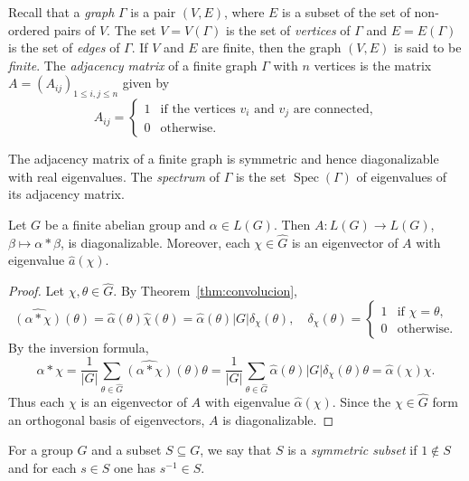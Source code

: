 Recall that a \emph{graph} $\Gamma$ is a pair $(V,E)$, where
$E$ is a subset of the set of non-ordered pairs of $V$. The set 
$V=V(\Gamma)$ is the set of \emph{vertices} of $\Gamma$ and $E=E(\Gamma)$
is the set of \emph{edges} of $\Gamma$. If $V$ and $E$ are finite, then the graph $(V,E)$ is said to be \emph{finite}. The 
\emph{adjacency matrix} of a finite graph $\Gamma$ with $n$ vertices is the matrix 
$A=(A_{ij})_{1\leq i,j\leq n}$ given by 
\[
  A_{ij}=\begin{cases}
    1 & \text{if the vertices $v_i$ and $v_j$ are connected,}\\
    0 & \text{otherwise.}
  \end{cases}
 \]

 The adjacency matrix of a finite graph is symmetric and hence
 diagonalizable with real eigenvalues. 
 The \emph{spectrum} of  $\Gamma$ is the set $\operatorname{Spec}(\Gamma)$ of eigenvalues
 of its adjacency matrix. 

\begin{lemma}
  \label{lem:eigenvalues}
  Let $G$ be a finite abelian group and $\alpha\in L(G)$. 
  Then $A\colon L(G)\to
  L(G)$, $\beta\mapsto \alpha*\beta$, is diagonalizable. Moreover, 
  each $\chi\in\widehat{G}$
  is an eigenvector of $A$ with eigenvalue $\widehat{a}(\chi)$. 
\end{lemma}

\begin{proof}
  Let $\chi,\theta\in\widehat{G}$. 
  By Theorem~\ref{thm:convolucion}, 
  \[
   \widehat{(\alpha*\chi)}(\theta)
    =\widehat{\alpha}(\theta)\widehat{\chi}(\theta)
    =\widehat{\alpha}({\theta})|G|\delta_{\chi}(\theta),
    \quad
    \delta_{\chi}(\theta)=\begin{cases} 
      1 & \text{if $\chi=\theta$},\\ 
      0 & \text{otherwise}.
    \end{cases}
  \]
  By the inversion formula, 
  \[
	\alpha*\chi=\frac{1}{|G|}\sum_{\theta\in\widehat{G}}\widehat{(\alpha*\chi)}(\theta)\theta
	=\frac{1}{|G|}\sum_{\theta\in\widehat{G}}\widehat{\alpha}(\theta)|G|\delta_{\chi}(\theta)\theta
	=\widehat{\alpha}(\chi)\chi. 
  \]
  Thus each $\chi$ is an eigenvector of $A$ with eigenvalue $\widehat{\alpha}(\chi)$. Since the 
  $\chi\in\widehat{G}$ form an orthogonal basis of eigenvectors, $A$ is diagonalizable. 
\end{proof}

For a group $G$ and a subset $S\subseteq G$, 
we say that $S$ is a \emph{symmetric subset} if
$1\not\in S$ and for each $s\in S$ one has $s^{-1}\in S$.

